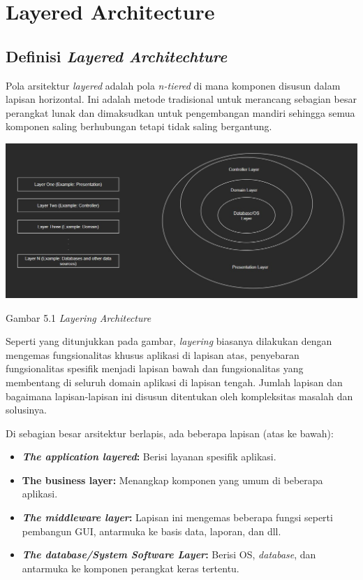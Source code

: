 \chapter{Layered Architecture}





\section{Definisi \textit{Layered Architechture}}

Pola arsitektur \textit{layered} adalah pola \textit{n-tiered} di mana komponen disusun dalam lapisan horizontal. Ini adalah metode tradisional untuk merancang sebagian besar perangkat lunak dan dimaksudkan untuk pengembangan mandiri sehingga semua komponen saling berhubungan tetapi tidak saling bergantung.

\includegraphics[width=\textwidth]{../images/Layering Architecture}
\begin{center}
	Gambar 5.1 \textit{Layering Architecture}
\end{center}

Seperti yang ditunjukkan pada gambar, \textit{layering} biasanya dilakukan dengan mengemas fungsionalitas khusus aplikasi di lapisan atas, penyebaran fungsionalitas spesifik menjadi lapisan bawah dan fungsionalitas yang membentang di seluruh domain aplikasi di lapisan tengah. Jumlah lapisan dan bagaimana lapisan-lapisan ini disusun ditentukan oleh kompleksitas masalah dan solusinya.

Di sebagian besar arsitektur berlapis, ada beberapa lapisan (atas ke bawah):

\begin{itemize}
    \item \textbf{\textit{The application layered}:} Berisi layanan spesifik aplikasi.
    \item \textbf{The business layer:} Menangkap komponen yang umum di beberapa aplikasi.
    \item \textbf{\textit{The middleware layer}:} Lapisan ini mengemas beberapa fungsi seperti pembangun GUI, antarmuka ke basis data, laporan, dan dll.
    \item \textbf{\textit{The database/System Software Layer}:} Berisi OS, \textit{database}, dan antarmuka ke komponen perangkat keras tertentu.
\end{itemize}

